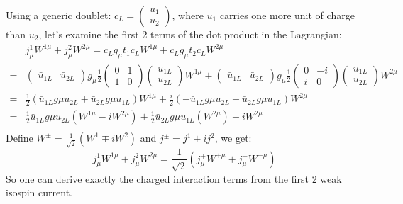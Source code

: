 Using a generic doublet: $c_L = \begin{pmatrix} u_1 \\ u_2 \end{pmatrix}$, where
$u_1$ carries one more unit of charge than $u_2$, let's examine the first 2
terms of the dot product in the Lagrangian:
\begin{equation*}
    \begin{aligned}
	& j^1_\mu W^{1\mu} + j^2_\mu W^{2\mu} = \bar{c}_Lg_\mu t_1 c_L W^{1\mu} + \bar{c}_L g_\mu t_2 c_L W^{2\mu}  \\
       =& \begin{pmatrix} \bar{u}_{1L}	& \bar{u}_{2L} \end{pmatrix} g_\mu \frac{1}{2} \begin{pmatrix}	0 & 1	\\ 1 & 0 \end{pmatrix} \begin{pmatrix} u_{1L} \\ u_{2L} \end{pmatrix} W^{1\mu}
        + \begin{pmatrix} \bar{u}_{1L}	& \bar{u}_{2L} \end{pmatrix} g_\mu \frac{1}{2} \begin{pmatrix}	0 & -i	\\ i & 0 \end{pmatrix} \begin{pmatrix} u_{1L} \\ u_{2L} \end{pmatrix} W^{2\mu}	\\
       =& \frac{1}{2} (\bar{u}_{1L}g\mu u_{2L} + \bar{u}_{2L}g\mu u_{1L}) W^{1\mu}	+ \frac{i}{2} (-\bar{u}_{1L}g\mu u_{2L} + \bar{u}_{2L}g\mu u_{1L}) W^{2\mu}	\\
       =& \frac{1}{2} \bar{u}_{1L}g\mu u_{2L} (W^{1\mu} - iW^{2\mu})  + \frac{1}{2} \bar{u}_{2L}g\mu u_{1L} (W^{2\mu}) + i W^{2\mu}	\\
    \end{aligned}
\end{equation*}
Define $W^\pm = \frac{1}{\sqrt{2}} (W^1 \mp iW^2)$ and $j^{\pm} = j^1 \pm ij^2$,
we get:
$$ j^1_\mu W^{1\mu} + j^2_\mu W^{2\mu} = \frac{1}{\sqrt{2}}(j^+_\mu W^{+\mu} + j^-_\mu W^{-\mu}) $$
So one can derive exactly the charged interaction terms from the first 2 weak 
isospin current.

